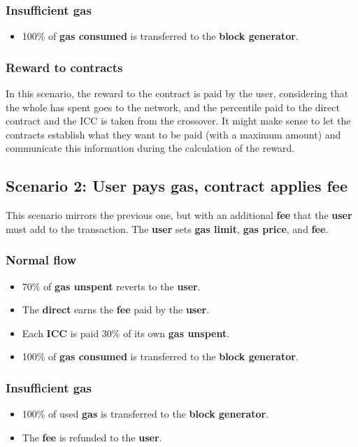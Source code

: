 \documentclass[twocolumn, nofootinbib]{revtex4-2} %
\newcommand{\emphathize}[1]{\textbf{#1}\xspace}
\newcommand{\blockgenerator}{\emphathize{block generator}}
\newcommand{\direct}{\emphathize{direct}}
\newcommand{\fee}{\emphathize{fee}}
\newcommand{\gas}{\emphathize{gas}}
\newcommand{\gasprice}{\emphathize{gas price}}
\newcommand{\gaslimit}{\emphathize{gas limit}}
\newcommand{\gasconsumed}{\emphathize{gas consumed}}
\newcommand{\gasunspent}{\emphathize{gas unspent}}
\newcommand{\icc}{\emphathize{ICC}}
\newcommand{\user}{\emphathize{user}}
\begin{document}
    \subsubsection{Insufficient gas}\label{sec:specifications:scenario-1:insufficient-gas}
    \begin{itemize}
        \item 100\% of \gasconsumed is transferred to the \blockgenerator.
    \end{itemize}

    \subsubsection{Reward to contracts}\label{sec:specifications:scenario-1:insufficient-gas-1:reward-to-contract}
    In this scenario, the reward to the contract is paid by the user,
    considering that the whole has spent goes to the network, and the
    percentile paid to the direct contract and the ICC is taken from the
    crossover.
    It might make sense to let the contracts establish what they want to be
    paid (with a maximum amount) and communicate this information during the
    calculation of the reward.

    \subsection{Scenario 2: User pays gas, contract applies fee}\label{subsec:scenario-2}
    This scenario mirrors the previous one, but with an additional \fee
    that the \user must add to the transaction.
    The \user sets \gaslimit, \gasprice, and \fee.

    \subsubsection{Normal flow}\label{sec:specifications:scenario-2:normal-flow}
    \begin{itemize}
        \item 70\% of \gasunspent reverts to the \user.
        \item The \direct earns the \fee paid by the \user.
        \item Each \icc is paid 30\% of its own \gasunspent.
        \item 100\% of \gasconsumed is transferred to the \blockgenerator.
    \end{itemize}

    \subsubsection{Insufficient gas}\label{sec:specifications:scenario-2:insufficient-gas}
    \begin{itemize}
        \item 100\% of used \gas is transferred to the \blockgenerator.
        \item The \fee is refunded to the \user.
    \end{itemize}
\end{document}
